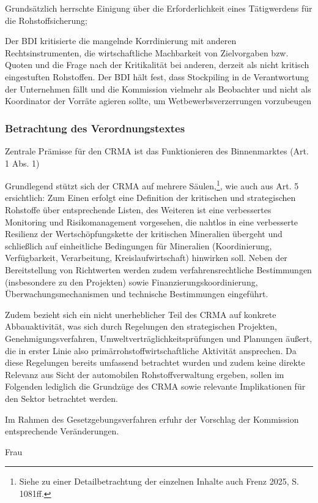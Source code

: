 \documentclass[12pt,a4paper,oneside]{book} %
\begin{document}
Grundsätzlich herrschte Einigung über die Erforderlichkeit eines Tätigwerdens für die Rohstoffsicherung;

Der BDI kritisierte die mangelnde Korrdinierung mit anderen Rechtsinstrumenten, die wirtschaftliche Machbarkeit von Zielvorgaben bzw. Quoten und die Frage nach der Kritikalität bei anderen, derzeit als nicht kritisch eingestuften Rohstoffen.
Der BDI hält fest, dass Stockpiling in de Verantwortung der Unternehmen fällt und die Kommission vielmehr als Beobachter und nicht als Koordinator der Vorräte agieren sollte, um Wetbewerbsverzerrungen vorzubeugen


\subsubsection{Betrachtung des Verordnungstextes}
Zentrale Prämisse für den CRMA ist das Funktionieren des Binnenmarktes (Art. 1 Abs. 1)

Grundlegend stützt sich der CRMA auf mehrere Säulen,\footnote{Siehe zu einer Detailbetrachtung der einzelnen Inhalte auch Frenz 2025, S. 1081ff.}, wie auch aus Art. 5 ersichtlich: Zum Einen erfolgt eine Definition der kritischen und strategischen Rohstoffe über entsprechende Listen, des Weiteren ist eine verbessertes Monitoring und Risikomanagement vorgesehen, die nahtlos in eine verbesserte Resilienz der Wertschöpfungskette der kritischen Mineralien übergeht und schließlich auf einheitliche Bedingungen für Mineralien (Koordinierung, Verfügbarkeit, Verarbeitung, Kreislaufwirtschaft) hinwirken soll. Neben der Bereitstellung von Richtwerten werden zudem verfahrensrechtliche Bestimmungen (insbesondere zu den Projekten) sowie Finanzierungskoordinierung, Überwachungsmechanismen und technische Bestimmungen eingeführt.

Zudem bezieht sich ein nicht unerheblicher Teil des CRMA auf konkrete Abbauaktivität, was sich durch Regelungen den strategischen Projekten, Genehmigungsverfahren, Umweltverträglichkeitsprüfungen und Planungen äußert, die in erster Linie also primärrohstoffwirtschaftliche Aktivität ansprechen. Da diese Regelungen bereits umfassend betrachtet wurden und zudem keine direkte Relevanz aus Sicht der automobilen Rohstoffverwaltung ergeben, sollen im Folgenden lediglich die Grundzüge des CRMA sowie relevante Implikationen für den Sektor betrachtet werden.

Im Rahmen des Gesetzgebungsverfahren erfuhr der Vorschlag der Kommission entsprechende Veränderungen.

Frau\autocite{Frau, NVwZ 2024, 1874}
\end{document}
